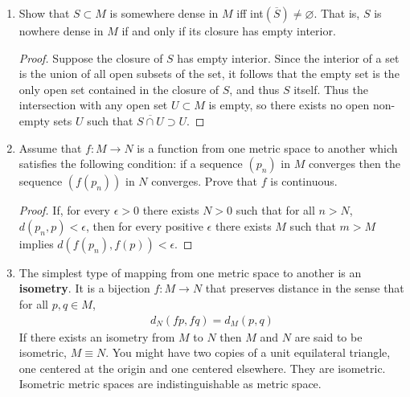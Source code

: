 \documentclass[11pt, a4paper, latinreim, shortsets]{notes}
\begin{document}
\begin{enumerate}[label={\bfseries 2.\arabic*}]
	\item Show that $S \subset M$ is somewhere dense in $M$ iff int$(\overline{S}) \neq \varnothing$.
	That is, $S$ is nowhere dense in $M$ if and only if its closure has empty interior.

	\begin{proof}
		Suppose the closure of $S$ has empty interior. Since the interior of a set is the union of all
		open subsets of the set, it follows that the empty set is the only open set contained in the closure
		of $S$, and thus $S$ itself. Thus the intersection with any open set $U \subset M$ is empty, so
		there exists no open non-empty sets $U$ such that $\overline{S \cap U} \supset U$.
	\end{proof}

	\item Assume that $f : M \to N$ is a function from one metric space to another which satisfies
	the following condition: if a sequence $(p_n)$ in $M$ converges then the sequence $(f(p_n))$ in $N$
	converges. Prove that $f$ is continuous.

	\begin{proof}
		If, for every $\epsilon > 0$ there exists $N > 0$ such that for all $n > N$, $d(p_n, p) < \epsilon$,
		then for every positive $\epsilon$ there exists $M$ such that $m > M$ implies $d(f(p_n),
		f(p)) < \epsilon$.
	\end{proof}

	\item The simplest type of mapping from one metric space to another is an \textbf{isometry}.
	It is a bijection $f : M \to N$ that preserves distance in the sense that for all $p, q \in M$,
	\begin{align}
		d_{N}(fp, fq) = d_M (p,q)
	\end{align}
	If there exists an isometry from $M$ to $N$ then $M$ and $N$ are said to be isometric, $M \equiv N$.
	You might have two copies of a unit equilateral triangle, one centered at the origin and one centered
	elsewhere. They are isometric. Isometric metric spaces are indistinguishable as metric space.


\end{enumerate}
\end{document}
